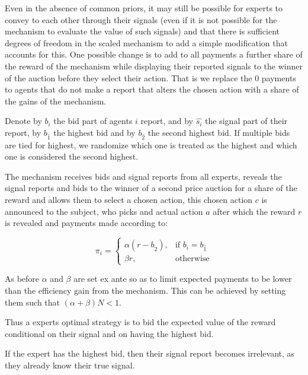 Even in the absence of common priors, it may still be possible for experts to convey to each other through their signals (even if it is not possible for the mechanism to evaluate the value of such signals) and that there is sufficient degrees of freedom in the scaled mechanism to add a simple modification that accounts for this.
One possible change is to add to all payments a further share of the reward of the mechanism while displaying their reported signals to the winner of the auction before they select their action. That is we replace the 0 payments to agents that do not make a report that alters the chosen action with a  share of the gains of the mechanism.

Denote by $b_i$ the bid part of agents $i$ report, and by $\hat{s_i}$ the signal part of their report, by $b_{\hat{1}}$ the highest bid and by $b_{\hat{2}}$ the second highest bid. If multiple bids are tied for highest, we  randomize which one is treated as the highest and which one is considered the second highest.

\begin{mech}
The mechanism receives bids and signal reports from all experts, reveals the signal reports and bids to the winner of a second price auction for a share of the reward and allows them to select a chosen action, this chosen action $c$ is announced to the subject, who picks and actual action $a$ after which the reward $r$ is revealed and payments made according to:

\[
    \pi_i = 
\begin{cases}
    \alpha (r - b_{\hat{2}} ) ,& \text{if } b_i = b_{\hat{1}}\\
    \beta r,              & \text{otherwise}
\end{cases}
\]

\end{mech}

As before $\alpha$ and $\beta$ are set ex ante so as to limit expected payments to be lower than the efficiency gain from the mechanism. This can be achieved by setting them such that $(\alpha + \beta)N < 1$.


Thus a experts optimal strategy is to bid the expected value of the reward conditional on their signal and on having the highest bid.



If the expert has the highest bid, then their signal report becomes irrelevant, as they already know their true signal. %

